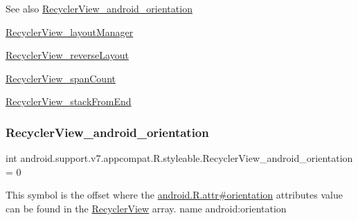 \begin{DoxySeeAlso}{See also}
\hyperlink{classandroid_1_1support_1_1v7_1_1appcompat_1_1R_1_1styleable_a203273169e4530ae4345acb488aad891}{Recycler\+View\+\_\+android\+\_\+orientation} 

\hyperlink{classandroid_1_1support_1_1v7_1_1appcompat_1_1R_1_1styleable_a4b3b3e33e1530975bdb28a270da14701}{Recycler\+View\+\_\+layout\+Manager} 

\hyperlink{classandroid_1_1support_1_1v7_1_1appcompat_1_1R_1_1styleable_a27340547a2470f70de21cecee86cefb0}{Recycler\+View\+\_\+reverse\+Layout} 

\hyperlink{classandroid_1_1support_1_1v7_1_1appcompat_1_1R_1_1styleable_ac99c387843c4ab5e1f26911d0baac306}{Recycler\+View\+\_\+span\+Count} 

\hyperlink{classandroid_1_1support_1_1v7_1_1appcompat_1_1R_1_1styleable_af2042a32a5c4358617f057338c016568}{Recycler\+View\+\_\+stack\+From\+End} 
\end{DoxySeeAlso}
\mbox{\label{classandroid_1_1support_1_1v7_1_1appcompat_1_1R_1_1styleable_a203273169e4530ae4345acb488aad891}} 
\subsubsection{\texorpdfstring{Recycler\+View\+\_\+android\+\_\+orientation}{RecyclerView\_android\_orientation}}
{\footnotesize\ttfamily int android.\+support.\+v7.\+appcompat.\+R.\+styleable.\+Recycler\+View\+\_\+android\+\_\+orientation = 0\hspace{0.3cm}{\ttfamily [static]}}

This symbol is the offset where the \hyperlink{}{android.\+R.\+attr\#orientation} attribute\textquotesingle{}s value can be found in the \hyperlink{classandroid_1_1support_1_1v7_1_1appcompat_1_1R_1_1styleable_ae3744efe286beea8d85d9fa344fa70df}{Recycler\+View} array.  name android\+:orientation \mbox{\label{classandroid_1_1support_1_1v7_1_1appcompat_1_1R_1_1styleable_a4b3b3e33e1530975bdb28a270da14701}} 

